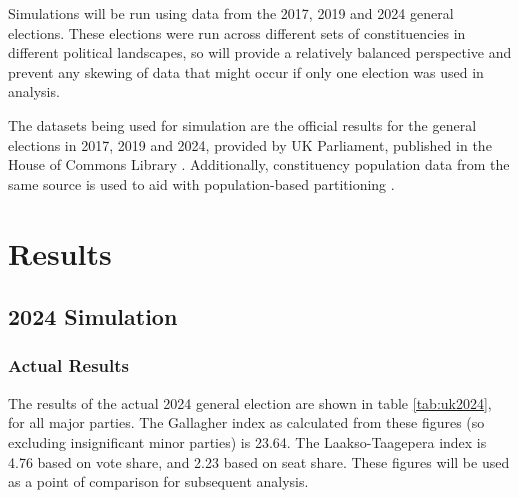 \documentclass{article}
\begin{document}
Simulations will be run using data from the 2017, 2019 and 2024 general elections. These elections were run across different sets of constituencies in different political landscapes, so
will provide a relatively balanced perspective and prevent any skewing of data that might occur if only one election was used in analysis.

The datasets being used for simulation are the official results for the general elections in 2017, 2019 and 2024, provided by UK Parliament, 
published in the House of Commons Library \cite{votes2017}\cite{votes2019}\cite{votes2024}. Additionally, constituency population data from the same source 
is used to aid with population-based partitioning \cite{popdata}.

\section{Results}

\subsection{2024 Simulation}

\subsubsection{Actual Results}
The results of the actual 2024 general election are shown in table \ref{tab:uk2024}, for all major parties. The Gallagher index as calculated from these figures (so excluding insignificant minor parties)
is 23.64. The Laakso-Taagepera index is 4.76 based on vote share, and 2.23 based on seat share. These figures will be used as a point of comparison for subsequent analysis.
\end{document}
